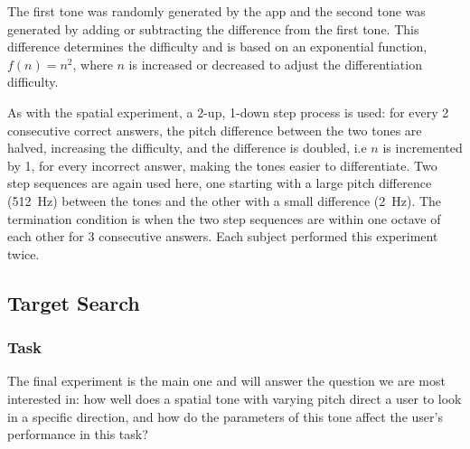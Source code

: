 \documentclass[format=sigconf, review=true, screen=true, anonymous=true]{acmart}
\begin{document}
The first tone was randomly generated by the app and the second tone was generated by adding or subtracting the difference from the first tone. This difference determines the difficulty and is based on an exponential function, $f(n) = n^2$, where $n$ is increased or decreased to adjust the differentiation difficulty. 

As with the spatial experiment, a 2-up, 1-down step process is used: for every 2 consecutive correct answers, the pitch difference between the two tones are halved, increasing the difficulty, and the difference is doubled, i.e $n$ is incremented by 1, for every incorrect answer, making the tones easier to differentiate. Two step sequences are again used here, one starting with a large pitch difference (\SI{512}{\hertz}) between the tones and the other with a small difference (\SI{2}{\hertz}). The termination condition is when the two step sequences are within one octave of each other for 3 consecutive answers. Each subject performed this experiment twice. 


\subsection{Target Search}

\subsubsection{Task}

The final experiment is the main one and will answer the question we are most interested in: how well does a spatial tone with varying pitch direct a user to look in a specific direction, and how do the parameters of this tone affect the user's performance in this task? %
\end{document}
